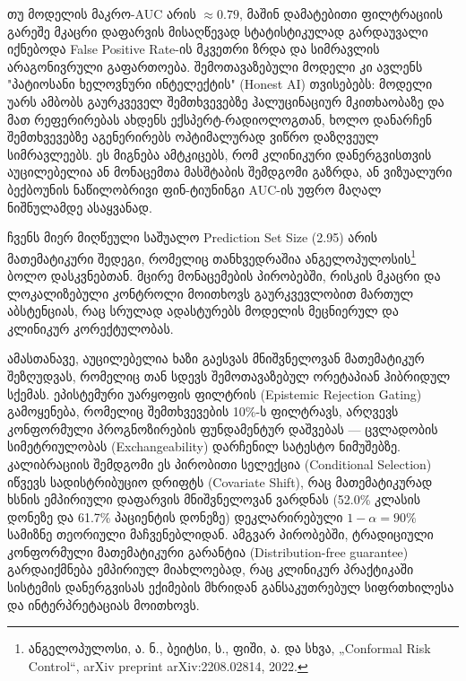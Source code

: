 \documentclass[12pt,a4paper,oneside]{report}
\begin{document}
თუ მოდელის მაკრო-AUC არის $\approx 0.79$, მაშინ დამატებითი ფილტრაციის გარეშე მკაცრი დაფარვის მისაღწევად სტატისტიკულად გარდაუვალი იქნებოდა False Positive Rate-ის მკვეთრი ზრდა და სიმრავლის არაგონივრული გაფართოება. შემოთავაზებული მოდელი კი ავლენს "პატიოსანი ხელოვნური ინტელექტის" (Honest AI) თვისებებს: მოდელი უარს ამბობს გაურკვეველ შემთხვევებზე ჰალუცინაციურ მკითხაობაზე და მათ რეფერირებას ახდენს ექსპერტ-რადიოლოგთან, ხოლო დანარჩენ შემთხვევებზე აგენერირებს ოპტიმალურად ვიწრო დაზღვეულ სიმრავლეებს. ეს მიგნება ამტკიცებს, რომ კლინიკური დანერგვისთვის აუცილებელია ან მონაცემთა მასშტაბის შემდგომი გაზრდა, ან ვიზუალური ბექბოუნის ნაწილობრივი ფინ-ტიუნინგი AUC-ის უფრო მაღალ ნიშნულამდე ასაყვანად.

ჩვენს მიერ მიღწეული საშუალო Prediction Set Size (2.95) არის მათემატიკური შედეგი, რომელიც თანხვედრაშია ანგელოპულოსის\footnote{ანგელოპულოსი, ა. ნ., ბეიტსი, ს., ფიში, ა. და სხვა, „Conformal Risk Control“, arXiv preprint arXiv:2208.02814, 2022.} ბოლო დასკვნებთან. მცირე მონაცემების პირობებში, რისკის მკაცრი და ლოკალიზებული კონტროლი მოითხოვს გაურკვევლობით მართულ აბსტენციას, რაც სრულად ადასტურებს მოდელის მეცნიერულ და კლინიკურ კორექტულობას.

ამასთანავე, აუცილებელია ხაზი გაესვას მნიშვნელოვან მათემატიკურ შეზღუდვას, რომელიც თან სდევს შემოთავაზებულ ორეტაპიან ჰიბრიდულ სქემას. ეპისტემური უარყოფის ფილტრის (Epistemic Rejection Gating) გამოყენება, რომელიც შემთხვევების 10\%-ს ფილტრავს, არღვევს კონფორმული პროგნოზირების ფუნდამენტურ დაშვებას — ცვლადობის სიმეტრიულობას (Exchangeability) დარჩენილ სატესტო ნიმუშებზე. კალიბრაციის შემდგომი ეს პირობითი სელექცია (Conditional Selection) იწვევს სადისტრიბუციო დრიფტს (Covariate Shift), რაც მათემატიკურად ხსნის ემპირიული დაფარვის მნიშვნელოვან ვარდნას (52.0\% კლასის დონეზე და 61.7\% პაციენტის დონეზე) დეკლარირებული $1-\alpha=90\%$ სამიზნე თეორიული მაჩვენებლიდან. ამგვარ პირობებში, ტრადიციული კონფორმული მათემატიკური გარანტია (Distribution-free guarantee) გარდაიქმნება ემპირიულ მიახლოებად, რაც კლინიკურ პრაქტიკაში სისტემის დანერგვისას ექიმების მხრიდან განსაკუთრებულ სიფრთხილესა და ინტერპრეტაციას მოითხოვს.
\end{document}
